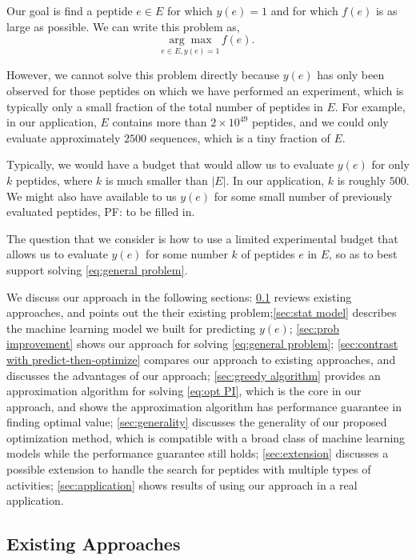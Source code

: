 \documentclass[11pt]{article}
\newcommand{\pfcomment}[1]{{\color{blue} PF: #1}}
\begin{document}
Our goal is find a peptide $e\in E$ for which $y(e)=1$ and for which $f(e)$ is as large as possible.  We can write this problem as,
\begin{equation}
  \underset{e \in E, y(e) = 1}{\arg\max} \, f(e).
  \label{eq:general problem}
\end{equation}

However, we cannot solve this problem directly because $y(e)$ has only been observed for those peptides on which we have performed an experiment, which is typically only a small fraction of the total number of peptides in $E$.  For example, in our application, $E$ contains more than $2 \times 10^{49}$ peptides, and we could only evaluate approximately $2500$ sequences, which is a tiny fraction of $E$.

Typically, we would have a budget that would allow us to evaluate $y(e)$ for only $k$ peptides, where $k$ is much smaller than $|E|$.  
In our application, $k$ is roughly $500$.
We might also have available to us $y(e)$ for some small number of previously evaluated peptides, 
\pfcomment{to be filled in.}


The question that we consider is how to use a limited experimental budget that allows us to evaluate $y(e)$ for some number $k$ of peptides $e$ in $E$, so as to best support solving \eqref{eq:general problem}.

We discuss our approach in the following sections: \ref{sec:existing approaches} reviews existing approaches, and points out the their existing problem;\ref{sec:stat model} describes the machine learning model we built for predicting $y(e)$; \ref{sec:prob improvement} shows our approach for solving \eqref{eq:general problem}; \ref{sec:contrast with predict-then-optimize} compares our approach to existing approaches, and discusses the advantages of our approach; \ref{sec:greedy algorithm}
provides an approximation algorithm for solving \eqref{eq:opt PI}, which is the core in our approach, and shows the approximation algorithm has performance guarantee in finding optimal value; \ref{sec:generality} discusses the generality of our proposed optimization method, which is compatible with a broad class of machine learning models while the performance guarantee still holds; \ref{sec:extension} discusses a possible extension to handle the search for peptides with multiple
types of activities; \ref{sec:application} shows results of using our approach in a real application.


\subsection{Existing Approaches} \label{sec:existing approaches}
\end{document}
